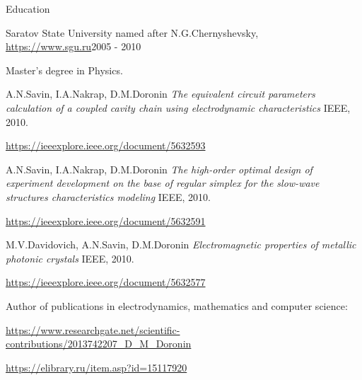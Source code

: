 \documentclass{resume}
\begin{document}

\begin{rSection}{Education}

\begin{rSubsection}{Saratov State University named after N.G.Chernyshevsky, \url{https://www.sgu.ru}}{2005 - 2010}{}{}

Master's degree in Physics.

\begin{thebibliography}{1}
    A.N.Savin, I.A.Nakrap, D.M.Doronin
    \textit{The equivalent circuit parameters calculation of a coupled cavity chain using electrodynamic characteristics}
    IEEE, 2010.

    \url{https://ieeexplore.ieee.org/document/5632593}

    A.N.Savin, I.A.Nakrap, D.M.Doronin
    \textit{The high-order optimal design of experiment development on the base of regular simplex for the slow-wave structures characteristics modeling}
    IEEE, 2010.

    \url{https://ieeexplore.ieee.org/document/5632591}


    M.V.Davidovich, A.N.Savin, D.M.Doronin
    \textit{Electromagnetic properties of metallic photonic crystals}
    IEEE, 2010.

    \url{https://ieeexplore.ieee.org/document/5632577}

\end{thebibliography}

Author of publications in electrodynamics, mathematics and computer science:
\item \url{https://www.researchgate.net/scientific-contributions/2013742207_D_M_Doronin}
\item \url{https://elibrary.ru/item.asp?id=15117920}

\end{rSubsection}
\end{rSection}
\end{document}
